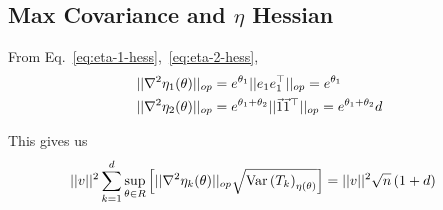 \documentclass[10pt, a4paper]{article}
\begin{document}
\subsection{Max Covariance and $\eta$ Hessian}

From Eq.~\ref{eq:eta-1-hess},~\ref{eq:eta-2-hess},
\begin{align*}
    \vert\vert\nabla^2 \eta_1(\theta)\rvert\rvert_{op}
    &=
    e^{\theta_1} \vert\vert e_1 e_1^\top\rvert\rvert_{op}
    =
    e^{\theta_1}
    \\
    \vert\vert\nabla^2 \eta_2(\theta)\rvert\rvert_{op}
    &=
    e^{\theta_1+\theta_2} \vert\vert\vec{1}\vec{1}^\top\rvert\rvert_{op}
    =
    e^{\theta_1+\theta_2} d
\end{align*}

This gives us
\begin{align*}
    \norm{v}^2
    \sum\limits_{k=1}^d
    \sup\limits_{\theta \in R}
    \bracket{%
        \norm{\nabla^2 \eta_k(\theta)}_{op}
        \sqrt{\var{T_k}_{\eta(\theta)}}
    }
    &=
    \norm{v}^2
    \sqrt{n}
    \paren{%
        1 + d
    }
\end{align*}
     
\end{document}
